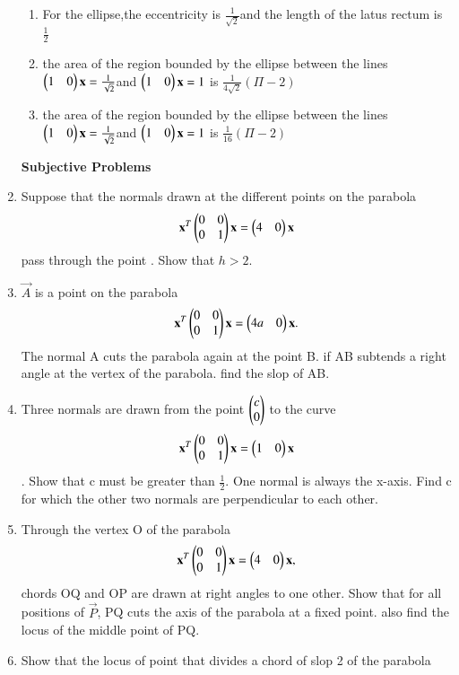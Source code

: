 \documentclass[journal,12pt,twocolumn]{IEEEtran}
\begin{document}
\begin{enumerate}[label=\arabic*]
\begin{enumerate}
    \item For the ellipse,the eccentricity is $\frac{1}{\sqrt{2}}$and the length of the latus rectum 		is $\frac{1}{2}$
    \item the area of the region bounded by the ellipse between the lines $\begin{pmatrix}1&0\end{pmatrix}\mathbf {x}=				\frac{1}{\sqrt{2}}$and $\begin{pmatrix}1&0\end{pmatrix}\mathbf{x}=1$ is $\frac{1}{4\sqrt{2}}(\Pi-2)$
    \item the area of the region bounded by the ellipse between the lines $\begin{pmatrix}1&0\end{pmatrix}\mathbf {x}=				\frac{1}{\sqrt{2}}$and $\begin{pmatrix}1&0\end{pmatrix}\mathbf{x}=1$ is $\frac{1}{16}(\Pi-2)$
    \end{enumerate}
    \textbf{Subjective Problems}
    \item Suppose that the normals drawn at the different points on the parabola
    \begin{align} 
    \mathbf{x}^T\begin{pmatrix}0&0\\0&1\end{pmatrix}\mathbf{x}=\begin{pmatrix}4&0\end{pmatrix}\mathbf{x}
    \end{align} pass through the point . Show that $h>2$.
    \item $\vec{A}$ is a point on the parabola 
    \begin{align}
    \mathbf{x}^T\begin{pmatrix}0&0\\0&1\end{pmatrix}\mathbf{x}=\begin{pmatrix}4a&0\end{pmatrix}\mathbf{x}.
    \end{align} The normal A cuts the parabola again at the point B. if AB subtends a right angle at 		the vertex of the parabola. find the slop of AB.
    \item Three normals are drawn from the point $\begin{pmatrix}c\\0\end{pmatrix}$ to the curve
    \begin{align}
    \mathbf{x}^T\begin{pmatrix}0&0\\0&1\end{pmatrix}\mathbf{x}=\begin{pmatrix}1&0\end{pmatrix}\mathbf{x}
    \end{align}. Show that c must be greater than $\frac{1}{2}$. One normal is always the x-axis. 			Find c for which the other two normals are perpendicular to each other.
    \item Through the vertex O of the parabola 
    \begin{align}
    \mathbf{x}^T\begin{pmatrix}0&0\\0&1\end{pmatrix}\mathbf{x}=\begin{pmatrix}4&0\end{pmatrix}\mathbf{x},
    \end{align} chords OQ and OP are drawn at right angles to one other. Show that for all positions of $\vec{P}$, PQ cuts the axis of the parabola at a fixed point. also find the locus of the middle point of PQ.
    \item Show that the locus of point that divides a chord of slop 2 of the parabola

\end{enumerate}
\end{document}
